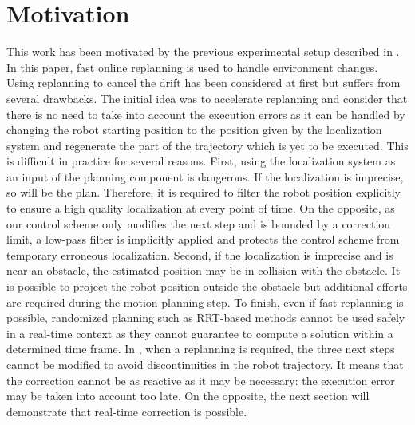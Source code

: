 \section{Motivation}
%
%
This work has been motivated by the previous experimental setup
described in \cite{11humanoids.baudouin}. In this paper, fast online
replanning is used to handle environment changes. Using replanning to
cancel the drift has been considered at first but suffers from several
drawbacks. The initial idea was to accelerate replanning and consider
that there is no need to take into account the execution errors as it
can be handled by changing the robot starting position to the position
given by the localization system and regenerate the part of the
trajectory which is yet to be executed. This is difficult in practice
for several reasons. First, using the localization system as an input
of the planning component is dangerous. If the localization is
imprecise, so will be the plan. Therefore, it is required to filter
the robot position explicitly to ensure a high quality localization at
every point of time. On the opposite, as our control scheme only
modifies the next step and is bounded by a correction limit, a
low-pass filter is implicitly applied and protects the control scheme
from temporary erroneous localization. Second, if the localization is
imprecise and is near an obstacle, the estimated position may be in
collision with the obstacle. It is possible to project the robot
position outside the obstacle but additional efforts are required
during the motion planning step. To finish, even if fast replanning is
possible, randomized planning such as RRT-based methods cannot be used
safely in a real-time context as they cannot guarantee to compute a
solution within a determined time frame. In
\cite{11humanoids.baudouin}, when a replanning is required, the three
next steps cannot be modified to avoid discontinuities in the robot
trajectory. It means that the correction cannot be as reactive as it
may be necessary: the execution error may be taken into account too
late. On the opposite, the next section will demonstrate that
real-time correction is possible.
%
%
%
%
%
\FloatBarrier
%
